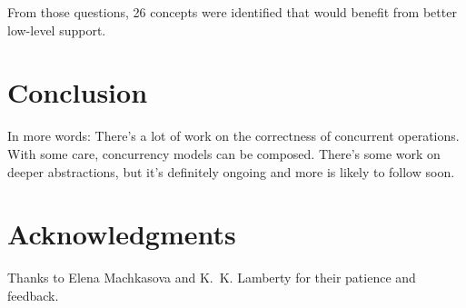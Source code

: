 \documentclass{sig-alternate}
\begin{document}
From those questions, 26 concepts were identified that would benefit from better low-level support.

\section{Conclusion}

In more words: There's a lot of work on the correctness of concurrent operations. With some care, concurrency models can be composed. There's some work on deeper abstractions, but it's definitely ongoing and more is likely to follow soon.

\section*{Acknowledgments}

Thanks to Elena Machkasova and K.~K. Lamberty for their patience and feedback.

\printbibliography{}
\end{document}
